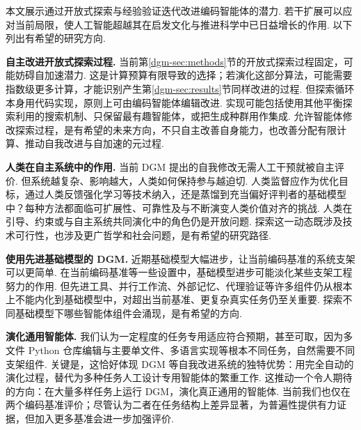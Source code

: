 本文展示通过开放式探索与经验验证迭代改进编码智能体的潜力. 若干扩展可以应对当前局限，使人工智能超越其在启发文化与推进科学中已日益增长的作用. 以下列出有希望的研究方向.

\textbf{自主改进开放式探索过程.} 当前第\ref{dgm-sec:methods}节的开放式探索过程固定，可能妨碍自加速潜力. 这是计算预算有限导致的选择；若演化这部分算法，可能需要指数级更多计算，才能识别产生第\ref{dgm-sec:results}节同样改进的过程. 但探索循环本身用代码实现，原则上可由编码智能体编辑改进. 实现可能包括使用其他平衡探索利用的搜索机制\cite{dgm-herr2025llm}、只保留最有趣智能体\cite{dgm-faldor2025omni}，或把生成种群用作集成\cite{dgm-samvelyan2024rainbow}. 允许智能体修改探索过程，是有希望的未来方向，不只自主改善自身能力，也改善分配有限计算、推动自我改进与自加速的元过程.

\textbf{人类在自主系统中的作用.} 当前 DGM 提出的自我修改无需人工干预就被自主评价. 但系统越复杂、影响越大，人类如何保持参与越迫切. 人类监督应作为优化目标，通过人类反馈强化学习\cite{dgm-ouyang2022training}等技术纳入，还是蒸馏到充当偏好评判者的基础模型中\cite{dgm-bai2022constitutional}？每种方法都面临可扩展性、可靠性及与不断演变人类价值对齐的挑战. 人类在引导、约束或与自主系统共同演化中的角色仍是开放问题. 探索这一动态既涉及技术可行性，也涉及更广哲学和社会问题，是有希望的研究路径.

\textbf{使用先进基础模型的 DGM.} 近期基础模型大幅进步，让当前编码基准的系统支架可以更简单\cite{dgm-yang2024sweagent}. 在当前编码基准等一些设置中，基础模型进步可能淡化某些支架工程努力的作用. 但先进工具、并行工作流、外部记忆、代理验证等许多组件仍从根本上不能内化到基础模型中，对超出当前基准、更复杂真实任务仍至关重要. 探索不同基础模型下哪些智能体组件会涌现，是有希望的方向.

\textbf{演化通用智能体.} 我们认为一定程度的任务专用适应符合预期，甚至可取，因为多文件 Python 仓库编辑与主要单文件、多语言实现等根本不同任务，自然需要不同支架组件. 关键是，这恰好体现 DGM 等自我改进系统的独特优势：用完全自动的演化过程，替代为多种任务人工设计专用智能体的繁重工作. 这推动一个令人期待的方向：在大量多样任务上运行 DGM，演化真正通用的智能体. 当前我们也仅在两个编码基准评价；尽管认为二者在任务结构上差异显著，为普遍性提供有力证据，但加入更多基准会进一步加强评价.
